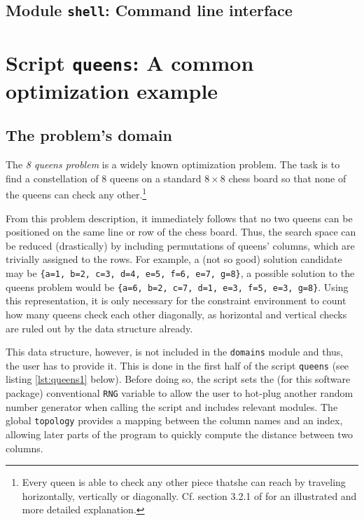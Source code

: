 \begin{appendices}
\section{Module \texttt{shell}: Command line interface}
\label{shell}

\chapter{Script \texttt{queens}: A common optimization example}
\label{chap:app:queens}

\section{The problem's domain}
\label{sec:app:queens:domain}

The \emph{8 queens problem} is a widely known optimization problem. The task is to find a constellation of 8 queens on a standard $8 \times 8$ chess board so that none of the queens can check any other.\footnote{Every queen is able to check any other piece thatshe can reach by traveling horizontally, vertically or diagonally. Cf. section 3.2.1 of \cite{RussellNorvig2003} for an illustrated and more detailed explanation.}

From this problem description, it immediately follows that no two queens can be positioned on the same line or row of the chess board. Thus, the search space can be reduced (drastically) by including permutations of queens' columns, which are trivially assigned to the rows. For example, a (not so good) solution candidate may be \texttt{\{a=1, b=2, c=3, d=4, e=5, f=6, e=7, g=8\}}, a possible solution to the queens problem would be \texttt{\{a=6, b=2, c=7, d=1, e=3, f=5, e=3, g=8\}}. Using this representation, it is only necessary for the constraint environment to count how many queens check each other diagonally, as horizontal and vertical checks are ruled out by the data structure already.

This data structure, however, is not included in the \texttt{domains} module and thus, the user has to provide it. This is done in the first half of the script \texttt{queens} (see listing \ref{lst:queens1} below). Before doing so, the script sets the (for this software package) conventional \texttt{RNG} variable to allow the user to hot-plug another random number generator when calling the script and includes relevant modules. The global \texttt{topology} provides a mapping between the column names and an index, allowing later parts of the program to quickly compute the distance between two columns.


\end{appendices}
